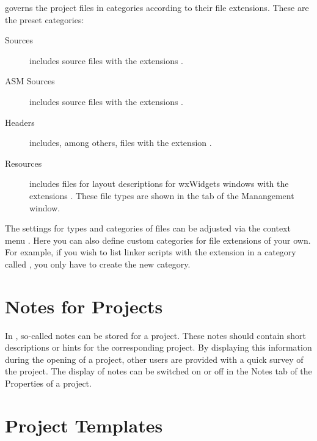 \codeblocks governs the project files in categories according to their file extensions. These are the preset categories:

\begin{description}
\item[Sources] includes source files with the extensions .
\item[ASM Sources] includes source files with the extensions .
\item[Headers] includes, among others, files with the extension .
\item[Resources] includes files for layout descriptions for wxWidgets windows with the extensions . These file types are shown in the  tab of the Manangement window.
\end{description}

The settings for types and categories of files can be adjusted via the context menu . Here you can also define custom categories for file extensions of your own. For example, if you wish to list linker scripts with the  extension in a category called , you only have to create the new category.


\section{Notes for Projects}

In \codeblocks, so-called notes can be stored for a project. These notes should contain short descriptions or hints for the corresponding project. By displaying this information during the opening of a project, other users are provided with a quick survey of the project. The display of notes can be switched on or off in the Notes tab of the Properties of a project.

\section{Project Templates}

